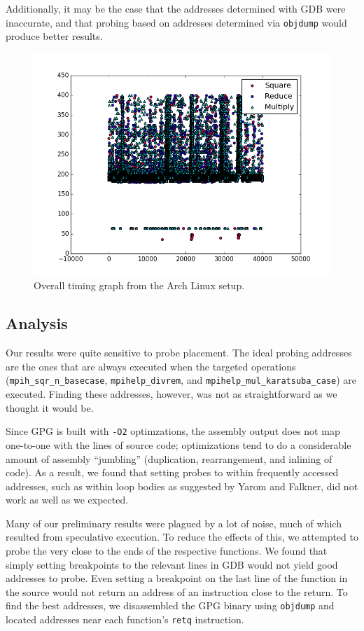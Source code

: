 \documentclass[11pt]{llncs}
\begin{document}
Additionally, it may be the case that the addresses determined with GDB were inaccurate,
and that probing based on addresses determined via \texttt{objdump} would produce
better results.

\begin{figure}[h]
  \centering
    \includegraphics[width=\linewidth]{img/data/arch-graph-1}
  \caption{Overall timing graph from the Arch Linux setup.}
  \label{fig:data-arch}
\end{figure}

\subsection{Analysis}

Our results were quite sensitive to probe placement. The ideal probing addresses
are the ones that are always executed when the targeted operations
(\texttt{mpih\_sqr\_n\_basecase}, \texttt{mpihelp\_divrem}, and
\texttt{mpihelp\_mul\_karatsuba\_case}) are executed. Finding these addresses,
however, was not as straightforward as we thought it would be.

Since GPG is built with \texttt{-O2} optimzations, the assembly output does not
map one-to-one with the lines of source code; optimizations tend to do a
considerable amount of assembly ``jumbling'' (duplication, rearrangement, and
inlining of code). As a result, we found that setting probes to within
frequently accessed addresses, such as within loop bodies as suggested by Yarom
and Falkner\cite{YF13}, did not work as well as we expected.

Many of our preliminary results were plagued by a lot of noise, much of which
resulted from speculative execution. To reduce the effects of this, we attempted
to probe the very close to the ends of the respective functions. We found that
simply setting breakpoints to the relevant lines in GDB would not yield good
addresses to probe. Even setting a breakpoint on the last line of the function
in the source would not return an address of an instruction close to the return.
To find the best addresses, we disassembled the GPG binary using
\texttt{objdump} and located addresses near each function's \texttt{retq}
instruction.
\end{document}
